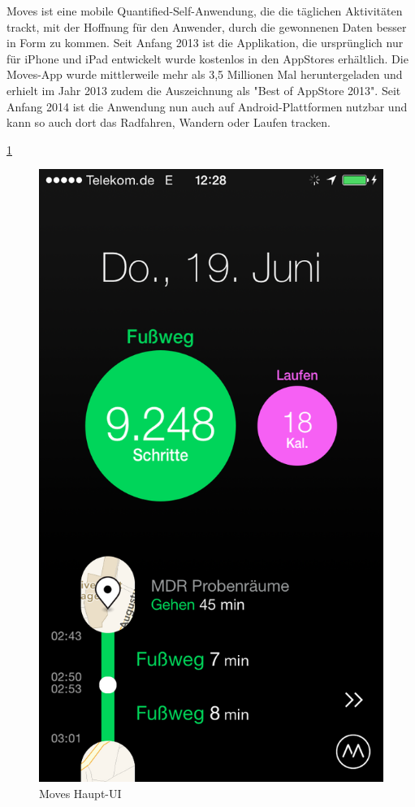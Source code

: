 Moves ist eine mobile Quantified-Self-Anwendung, die die täglichen Aktivitäten trackt, mit der Hoffnung für den Anwender, durch die gewonnenen Daten besser in Form zu kommen. 
Seit Anfang 2013 ist die Applikation, die ursprünglich nur für iPhone und iPad entwickelt wurde kostenlos in den AppStores erhältlich. 
Die Moves-App wurde mittlerweile mehr als 3,5 Millionen Mal heruntergeladen und erhielt im Jahr 2013 zudem die Auszeichnung als "Best of AppStore 2013".
Seit Anfang 2014 ist die Anwendung nun auch auf Android-Plattformen nutzbar und kann so auch dort das Radfahren, Wandern oder Laufen tracken.

\ref{fig:Haupt-UI}

\begin{figure}[h]
\centering
\includegraphics[scale=0.3]{images/moves-app-main-ui.PNG}
\caption{Moves Haupt-UI \cite{fig:Haupt-UI}}
\label{fig:Haupt-UI}
\end{figure}

